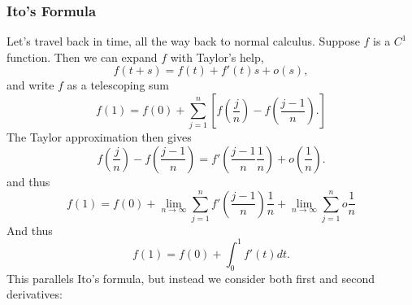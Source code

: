 \documentclass[oneside]{book}
\begin{document}

\subsubsection{Ito's Formula}

Let's travel back in time, all the way back to normal calculus. Suppose $f$ is a $C^1$ function. Then we can expand $f$ with Taylor's help,
\[f(t + s) = f(t) + f'(t)s + o(s),\] and write $f$ as a telescoping sum
\[f(1) = f(0) + \sum_{j=1}^n [f(\frac{j}{n}) - f(\frac{j-1}{n}).]\]
The Taylor approximation then gives
\[f(\frac{j}{n}) - f(\frac{j-1}{n}) = f'(\frac{j-1}{n}\frac{1}{n}) + o(\frac{1}{n}).\] and thus 
\[f(1) = f(0) + \lim\limits_{n\to \infty} \sum_{j=1}^n f'(\frac{j-1}{n})\frac{1}{n} + \lim\limits_{n \to \infty} \sum_{j=1}^n o \frac{1}{n}\]
And thus 
\[f(1) = f(0) + \int_0^1 f'(t)dt.\]
This parallels Ito's formula, but instead we consider both first and second derivatives:
\end{document}
